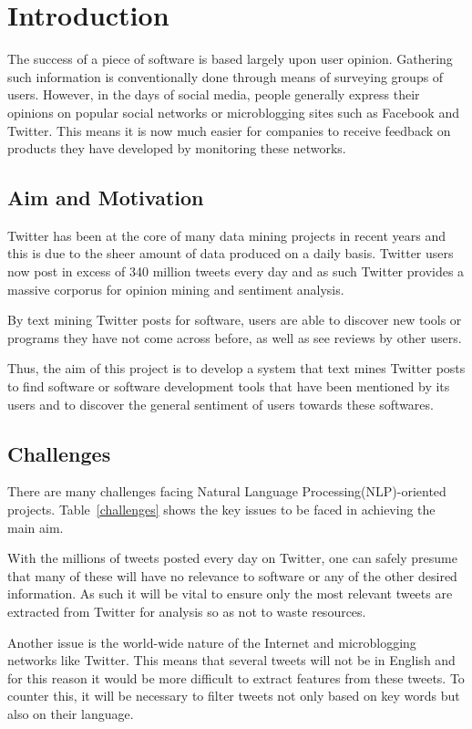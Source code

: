 \chapter{Introduction}
\label{cha:intro}
The success of a piece of software is based largely upon user opinion. Gathering such information is conventionally done through means of surveying groups of users. However, in the days of social media, people generally express their opinions on popular social networks or microblogging sites such as Facebook and Twitter. This means it is now much easier for companies to receive feedback on products they have developed by monitoring these networks.

\section{Aim and Motivation}
\label{sec:aim}
Twitter has been at the core of many data mining projects in recent years and this is due to the sheer amount of data produced on a daily basis. Twitter users now post in excess of 340 million tweets every day\cite{twitterblog} and as such Twitter provides a massive corporus for opinion mining and sentiment analysis.

By text mining Twitter posts for software, users are able to discover new tools or programs they have not come across before, as well as see reviews by other users.

Thus, the aim of this project is to develop a system that text mines Twitter posts to find software or software development tools that have been mentioned by its users and to discover the general sentiment of users towards these softwares.

\section{Challenges}
There are many challenges facing Natural Language Processing(NLP)-oriented projects. Table~\ref{challenges} shows the key issues to be faced in achieving the main aim.

With the millions of tweets posted every day on Twitter, one can safely presume that many of these will have no relevance to software or any of the other desired information. As such it will be vital to ensure only the most relevant tweets are extracted from Twitter for analysis so as not to waste resources.

Another issue is the world-wide nature of the Internet and microblogging networks like Twitter. This means that several tweets will not be in English and for this reason it would be more difficult to extract features from these tweets. To counter this, it will be necessary to filter tweets not only based on key words but also on their language.

